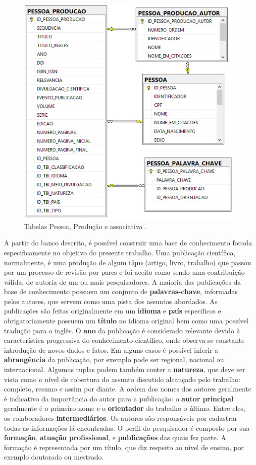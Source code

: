 \documentclass[12pt]{article}
\begin{document}
\begin{figure}[ht]
    \centering
    \includegraphics[width=.55\textwidth]{database.png}
    \caption{Tabelas Pessoa, Produção e associativa \cite{prass2019parser}.}\label{fig:database}
\end{figure}
 
A partir do banco descrito, é possível construir uma base de conhecimento focada especificamente no objetivo do presente trabalho. Uma publicação científica, normalmente, é uma produção de algum \textbf{tipo} (artigo, livro, trabalho) que passou por um processo de revisão por pares e foi aceito como sendo uma contribuição válida, de autoria de um ou mais pesquisadores.  A maioria das publicações da base de conhecimento possuem um conjunto de \textbf{palavras-chave}, informadas pelos autores, que servem como uma pista dos assuntos abordados. As publicações são feitas originalmente em um \textbf{idioma} e \textbf{país} específicos e obrigatoriamente possuem um \textbf{título} no idioma original bem como uma possível tradução para o inglês. O \textbf{ano} da publicação é considerado relevante devido à característica progressiva do conhecimento científico, onde observa-se constante introdução de novos dados e fatos. Em alguns casos é possível inferir a \textbf{abrangência} da publicação, por exemplo pode ser regional, nacional ou internacional. Algumas tuplas podem também conter a \textbf{natureza}, que deve ser vista como o nível de cobertura do assunto discutido alcançado pelo trabalho: completo, resumo e assim por diante. A ordem dos nomes dos autores geralmente é indicativo da importância do autor para a publicação: o \textbf{autor principal} geralmente é o primeiro nome e o \textbf{orientador} do trabalho o último. Entre eles, os colaboradores \textbf{intermediários}. Os autores são responsáveis por cadastrar todas as informações lá encontradas. O perfil do pesquisador é composto por sua \textbf{formação}, \textbf{atuação profissional}, e \textbf{publicações} das quais fez parte. A formação é representada por um título, que diz respeito ao nível de ensino, por exemplo doutorado ou mestrado.
\end{document}
